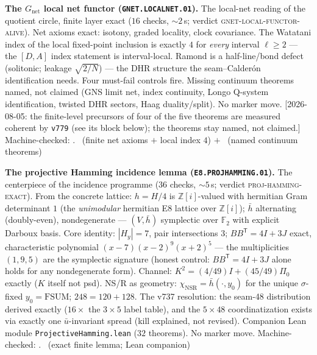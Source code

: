 \documentclass[11pt,a4paper]{article}
\newcommand{\Z}{\mathbb{Z}}
\theoremstyle{definition}
\begin{document}
\par\smallskip\noindent\textbf{The $G_{\mathrm{net}}$ local net
functor (\texttt{GNET.LOCALNET.01}).}
The local-net reading of the quotient circle, finite layer exact
($16$ checks, ${\sim}2$\,s; verdict
\textsc{gnet-local-functor-alive}).  Net axioms exact: isotony,
graded locality, clock covariance.  The Watatani index of the local
fixed-point inclusion is exactly $4$ for \emph{every} interval
$\ell\ge2$ --- the $[D,A]$ index statement is interval-local.
Ramond is a half-line/bond defect (solitonic; leakage
$\sqrt{2/N}$) --- the DHR structure the seam--Calder\'on
identification needs.  Four must-fail controls fire.  Missing
continuum theorems named, not claimed (GNS limit net, index
continuity, Longo Q-system identification, twisted DHR sectors,
Haag duality/split).  No marker move.  [2026-08-05: the
finite-level precursors of four of the five theorems are measured
coherent by \texttt{v779} (see its block below); the theorems stay
named, not claimed.]
Machine-checked: .
\mE\ (finite net axioms $+$ local index $4$) $+$ \mC\ (named
continuum theorems)
\par\smallskip

\par\smallskip\noindent\textbf{The projective Hamming incidence lemma
(\texttt{E8.PROJHAMMING.01}).}
The centerpiece of the incidence programme ($36$ checks,
${\sim}5$\,s; verdict \textsc{proj-hamming-exact}).  From the
concrete lattice: $h=H/4$ is $\Z[i]$-valued with hermitian Gram
determinant $1$ (the \emph{unimodular} hermitian E8 lattice over
$\Z[i]$); $\bar h$ alternating (doubly-even), nondegenerate ---
$(V,\bar h)$ symplectic over $\mathbb{F}_2$ with explicit Darboux
basis.  Core identity: $|H_y|=7$, pair intersections $3$;
$BB^{\mathsf T}=4I+3J$ exact, characteristic polynomial
$(x-7)(x-2)^9(x+2)^5$ --- the multiplicities $(1,9,5)$ are the
symplectic signature (honest control: $BB^{\mathsf T}=4I+3J$ alone
holds for any nondegenerate form).  Channel:
$K^2=(4/49)I+(45/49)\Pi_0$ exactly ($K$ itself not psd).  NS/R as
geometry: $\chi_{\mathrm{NSR}}=\bar h(\cdot,y_0)$ for the unique
$\sigma$-fixed $y_0=\mathrm{FSUM}$; $248=120+128$.  The v737
resolution: the seam-48 distribution derived exactly ($16\times$
the $3\times5$ label table), and the $5\times48$ coordinatization
exists via exactly one $\bar u$-invariant spread (kill explained,
not revised).  Companion Lean module
\texttt{ProjectiveHamming.lean} ($32$ theorems).  No marker move.
Machine-checked: .
\mE\ (exact finite lemma; Lean companion)
\par\smallskip
\end{document}
